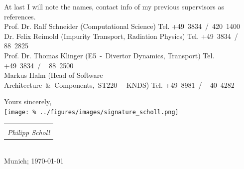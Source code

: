\documentclass[11pt,a4paper]{moderncv}
\makeatletter
\newcommand{\sign}[1]{%
  \begin{tabular}[t]{@{}l@{}}
  \makebox[1.5in]{\dotfill}\\
  \strut\emph{#1}\strut%
  \end{tabular}}%
\makeatother
\begin{document}
%
At last I will note the names, contact info of my previous supervisors as references.\\[0.25cm]%
%
\hspace*{0.5cm}Prof. Dr. Ralf Schneider (Computational Science)%
\hfill Tel. +49~3834~/~420~1400\\
\hspace*{0.5cm}Dr. Felix Reimold (Impurity Transport, Radiation Physics)%
\hfill Tel. +49~3834~/~~\,88~2825\\
\hspace*{0.5cm}Prof. Dr. Thomas Klinger (E5~-~Divertor Dynamics, Transport)%
\hfill Tel. +49~3834~/~~\,88~2500\\
\hspace*{0.5cm}Markus Halm (Head of Software\\%
\hspace*{2.95cm}Architecture~\&~Components,~ST220~-~KNDS)%
\hfill Tel. +49~8981~/~~\,40~4282\\%
%
\begin{flushleft}%
    Yours sincerely,\\[0.1cm]%
    \texttt{[image: \%
        ../figures/images/signature\_scholl.png]}\\%
    \vspace*{-.5cm}%
    \sign{Philipp Scholl}\\[0.0cm]%
    Munich; \today%
\end{flushleft}%
%




\end{document}
